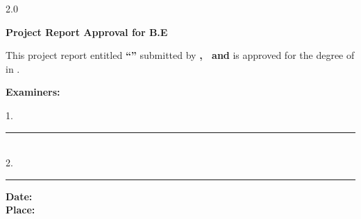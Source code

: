 
\thispagestyle{empty}
\begin{spacing}{2.0}
\begin{center}
    {\Large \textbf{Project Report Approval for B.E}}
\end{center}

\vspace{0.5cm}

\justifying

This project report entitled \textbf{``\ProjectTitle''}
submitted by \textbf{\AuthorOne, \AuthorTwo\ and \AuthorThree} is approved for the degree of
\textbf{\Degree} in \textbf{\Department}.

\vspace{2cm}

\hspace{235pt} \textbf{Examiners:}

\begin{flushright}
1.\ \rule{7cm}{0.4pt} \vspace{2em} \\
2.\ \rule{7cm}{0.4pt}
\end{flushright}

\vfill

\noindent \textbf{Date:} \\[2em]
\textbf{Place:}
\end{spacing}
\clearpage

